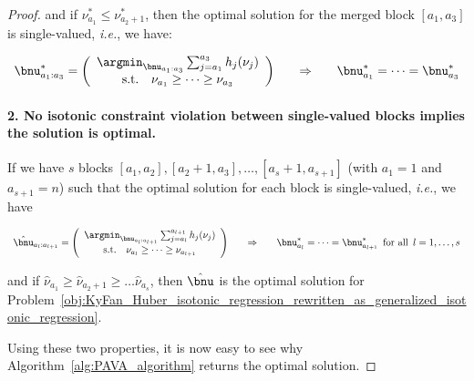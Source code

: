\begin{proof}
and if $\nu_{a_1}^* \leq \nu_{a_2+1}^*$, then the optimal solution for the merged block $[a_1, a_3]$ is single-valued, \textit{i.e.}, we have:

\begin{equation}
\begin{array}{c@{\hspace{2em}}c@{\hspace{2em}}c}
\bnu_{a_1:a_3}^* =  
\left(\begin{array}{c}
\argmin_{\bnu_{a_1:a_3}} \sum_{j=a_1}^{a_3} h_j(\nu_j) \\
\text{s.t.} \quad \nu_{a_1} \geq \cdots \geq \nu_{a_3}
\end{array}\right) & 
\Rightarrow & \bnu_{a_1}^* = \cdots = \bnu_{a_3}^*
\end{array}
\end{equation}

\paragraph{2. No isotonic constraint violation between single-valued blocks implies the solution is optimal.}
If we have $s$ blocks $[a_1, a_2], [a_2+1, a_3], \ldots, [a_{s}+1, a_{s+1}]$ (with $a_1=1$ and $a_{s+1}=n$) such that the optimal solution for each block is single-valued, \textit{i.e.}, we have

\begin{equation}
\begin{array}{c@{\hspace{2em}}c@{\hspace{2em}}c}
\hat{\bnu}_{a_l:a_{l+1}} =
\left(\begin{array}{c}
\argmin_{\bnu_{a_l:a_{l+1}}} \sum_{j=a_l}^{a_{l+1}} h_j(\nu_j) \\
\text{s.t.} \quad \nu_{a_l} \geq \cdots \geq \nu_{a_{l+1}}
\end{array}\right) &
\Rightarrow & \bnu_{a_l}^* = \cdots = \bnu_{a_{l+1}}^* \, \text{ for all } \, l=1, \ldots, s
\end{array}
\end{equation}

and if $\hat{\nu}_{a_1} \geq \hat{\nu}_{a_2+1} \geq \ldots \hat{\nu}_{a_{s}}$, then $\hat{\bnu}$ is the optimal solution for Problem~\eqref{obj:KyFan_Huber_isotonic_regression_rewritten_as_generalized_isotonic_regression}.

Using these two properties, it is now easy to see why Algorithm~\ref{alg:PAVA_algorithm} returns the optimal solution.


\end{proof}
